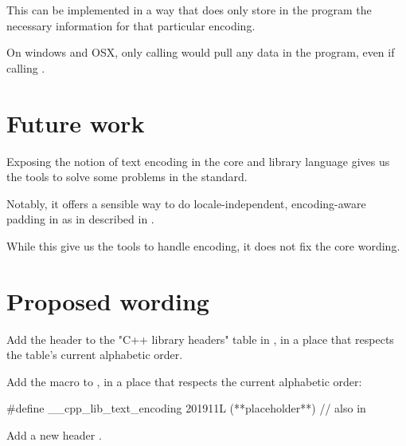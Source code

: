 \documentclass{wg21}
\begin{document}
This can be implemented in a way that does only store in the program the necessary information for that particular encoding.

On windows and OSX, only calling  would pull any data in the program, even if calling .


\section{Future work}

Exposing the notion of text encoding in the core and library language gives us the tools to solve some
problems in the standard.

Notably, it offers a sensible way to do locale-independent, encoding-aware padding in  as in described in \cite{P1868}.

While this give us the tools to handle encoding, it does not fix the core wording.

\newpage


\section{Proposed wording}

Add the header  to the "C++ library headers" table in
\tcode{[headers]}, in a place that respects the table’s current alphabetic
order.

Add the macro  to , in a
place that respects the current alphabetic order:

\begin{codeblock}
#define __cpp_lib_text_encoding 201911L (**placeholder**) // also in 
\end{codeblock}

Add a new header .
\end{document}
